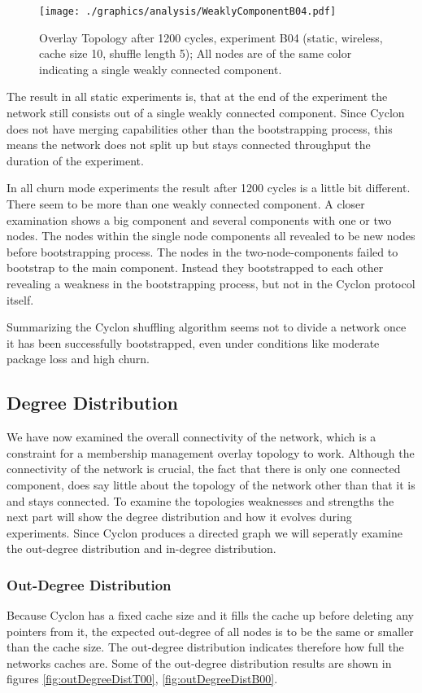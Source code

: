 \begin{figure}
	\texttt{[image: ./graphics/analysis/WeaklyComponentB04.pdf]}
	\caption{Overlay Topology after 1200 cycles, experiment B04
	(static, wireless, cache size 10, shuffle length 5); All nodes are of the same
	color indicating a single weakly connected component.}
	\label{fig:WeaklyCompB04}
\end{figure}

The result in all static experiments is, that at the end of the experiment the
network still consists out of a single weakly connected component. Since Cyclon does not have
merging capabilities other than the bootstrapping process, this means the
network does not split up but stays connected throughput the duration of the
experiment.

In all churn mode experiments the result after 1200 cycles is a little bit
different. There seem to be more than one weakly connected component. A closer
examination shows a big component and several components with one or two
nodes. The nodes within the single node components all revealed to be new nodes
before bootstrapping process. The nodes in the two-node-components failed to
bootstrap to the main component. Instead they bootstrapped to each other
revealing a weakness in the bootstrapping process, but not in the Cyclon
protocol itself.

Summarizing the Cyclon shuffling algorithm seems not to divide a network once it
has been successfully bootstrapped, even under conditions like moderate package
loss and high churn.

\subsection{Degree Distribution}
We have now examined the overall connectivity of the network, which is a
constraint for a membership management overlay topology to work. Although the
connectivity of the network is crucial, the fact that there is only one
connected component, does say little about the topology of the network other
than that it is and stays connected. To examine the topologies weaknesses and
strengths the next part will show the degree distribution and how it evolves
during experiments. Since Cyclon produces a directed graph we will seperatly
examine the out-degree distribution and in-degree distribution.
\subsubsection{Out-Degree Distribution}
\label{subsubsec:outDegree}
Because Cyclon has a fixed cache size and it fills the cache up before deleting
any pointers from it, the expected out-degree of all nodes is to be the same or
smaller than the cache size. The out-degree distribution indicates therefore how
full the networks caches are. Some of the out-degree distribution results are
shown in figures \ref{fig:outDegreeDistT00}, \ref{fig:outDegreeDistB00}. \\

